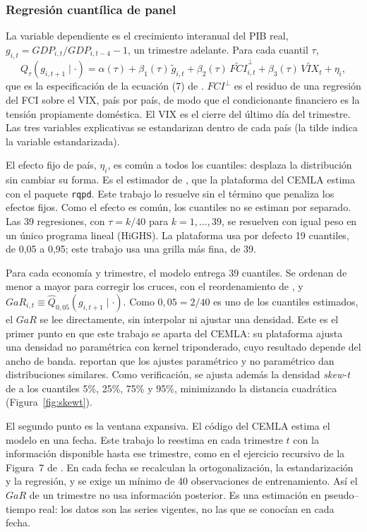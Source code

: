 \subsubsection{Regresión cuantílica de panel}

La variable dependiente es el crecimiento interanual del PIB real, $g_{i,t}=GDP_{i,t}/GDP_{i,t-4}-1$, un trimestre adelante. Para cada cuantil $\tau$,
\[ Q_\tau\!\left(g_{i,t+1}\mid\cdot\right)=\alpha(\tau)+\beta_1(\tau)\,\tilde g_{i,t}+\beta_2(\tau)\,\widetilde{FCI}^{\perp}_{i,t}+\beta_3(\tau)\,\widetilde{VIX}_t+\eta_i, \]
que es la especificación de la ecuación (7) de \citet{OssandonBusch2022}. $FCI^{\perp}$ es el residuo de una regresión del FCI sobre el VIX, país por país, de modo que el condicionante financiero es la tensión propiamente doméstica. El VIX es el cierre del último día del trimestre. Las tres variables explicativas se estandarizan dentro de cada país (la tilde indica la variable estandarizada).

El efecto fijo de país, $\eta_i$, es común a todos los cuantiles: desplaza la distribución sin cambiar su forma. Es el estimador de \citet{Koenker2004}, que la plataforma del CEMLA estima con el paquete \texttt{rqpd}. Este trabajo lo resuelve sin el término que penaliza los efectos fijos. Como el efecto es común, los cuantiles no se estiman por separado. Las 39 regresiones, con $\tau=k/40$ para $k=1,\dots,39$, se resuelven con igual peso en un único programa lineal (HiGHS). La plataforma usa por defecto 19 cuantiles, de 0,05 a 0,95; este trabajo usa una grilla más fina, de 39.

Para cada economía y trimestre, el modelo entrega 39 cuantiles. Se ordenan de menor a mayor para corregir los cruces, con el reordenamiento de \citet{ChernozhukovEtAl2010}, y $GaR_{i,t}\equiv\hat Q_{0{,}05}(g_{i,t+1}\mid\cdot)$. Como $0{,}05=2/40$ es uno de los cuantiles estimados, el $GaR$ se lee directamente, sin interpolar ni ajustar una densidad. Este es el primer punto en que este trabajo se aparta del CEMLA: su plataforma ajusta una densidad no paramétrica con kernel triponderado, cuyo resultado depende del ancho de banda. \citet{OssandonBusch2022} reportan que los ajustes paramétrico y no paramétrico dan distribuciones similares. Como verificación, se ajusta además la densidad \textit{skew-t} de \citet{ABG2019b} a los cuantiles 5\%, 25\%, 75\% y 95\%, minimizando la distancia cuadrática (Figura~\ref{fig:skewt}).

El segundo punto es la ventana expansiva. El código del CEMLA estima el modelo en una fecha. Este trabajo lo reestima en cada trimestre $t$ con la información disponible hasta ese trimestre, como en el ejercicio recursivo de la Figura~7 de \citet{OssandonBusch2022}. En cada fecha se recalculan la ortogonalización, la estandarización y la regresión, y se exige un mínimo de 40 observaciones de entrenamiento. Así el $GaR$ de un trimestre no usa información posterior. Es una estimación en pseudo--tiempo real: los datos son las series vigentes, no las que se conocían en cada fecha.

